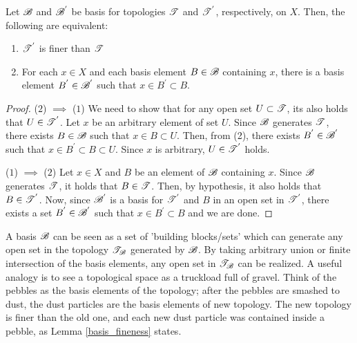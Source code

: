 \documentclass[a4paper,english,12pt]{article}
\begin{document}
\begin{lem} \label{basis_fineness}
 Let $\mathscr{B}$ and $\mathscr{B}^{'}$ be basis for topologies $\mathscr{T}$ and $\mathscr{T}^{'}$, respectively, on $X$. Then, the following are equivalent:
 \begin{enumerate}
  \item $\mathscr{T}^{'}$ is finer than $\mathscr{T}$
  \item For each $x \in X$  and each basis element $B \in \mathscr{B}$ containing $x$, there is a basis element $B^{'} \in \mathscr{B}^{'}$ such that $x \in B^{'} \subset B$.
 \end{enumerate}
\end{lem}
\begin{proof}
 ($2$) $\implies$ ($1$) We need to show that for any open set $U \subset \mathscr{T}$, its also holds that $U \in \mathscr{T}^{'}$. Let $x$ be an arbitrary element of set $U$. Since 
 $\mathscr{B}$ generates $\mathscr{T}$, there exists $B \in \mathscr{B}$ such that $x \in B \subset U$. Then, from (2), there exists $B^{'} \in \mathscr{B}^{'}$ such that $x \in B^{'} \subset B \subset U$.
 Since $x$ is arbitrary, $U \in \mathscr{T}^{'}$ holds. 
 
 ($1$) $\implies$ ($2$) Let $x \in X$ and $B$ be an element of $\mathscr{B}$ containing $x$. Since $\mathscr{B}$ generates $\mathscr{T}$, it holds that $B \in \mathscr{T}$. Then, by hypothesis, it also 
 holds that $B \in \mathscr{T}^{'}$. Now, since $\mathscr{B}^{'}$ is a basis for $\mathscr{T}^{'}$ and $B$ in an open set in $\mathscr{T}^{'}$, there exists a set $B^{'} \in \mathscr{B}^{'}$ such that 
 $x \in B^{'} \subset B$ and we are done.
\end{proof}

A basis $\mathscr{B}$ can be seen as a set of 'building blocks/sets' which can generate any open set in the topology $\mathscr{T}_{\mathscr{B}}$ generated by $\mathscr{B}$. By taking 
arbitrary union or finite intersection of the basis elements, any open set in $\mathscr{T}_{\mathscr{B}}$ can be realized. A useful analogy is to see a topological space 
as a truckload full of gravel. Think of the pebbles as the basis elements of the topology; after the pebbles are smashed to dust, the dust particles are the
basis elements of new topology. The new topology is finer than the old one, and each new dust particle was contained inside a pebble, as Lemma \ref{basis_fineness} states.
\end{document}
